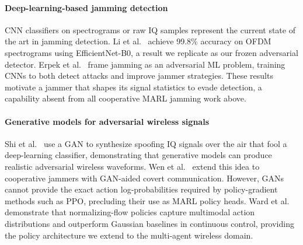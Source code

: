 \paragraph{Deep-learning-based jamming detection}
CNN classifiers on spectrograms or raw IQ samples represent the current
state of the art in jamming detection.
Li et al.~\cite{li2022jamming_ofdm} achieve 99.8\% accuracy on OFDM
spectrograms using EfficientNet-B0, a result we replicate as our frozen
adversarial detector.
Erpek et al.~\cite{erpek2019deep} frame jamming as an adversarial ML problem,
training CNNs to both detect attacks and improve jammer strategies.
These results motivate a jammer that shapes its signal statistics to evade
detection, a capability absent from all cooperative MARL jamming work above.

\paragraph{Generative models for adversarial wireless signals}
Shi et al.~\cite{sagduyu2021gan} use a GAN to synthesize spoofing IQ signals
over the air that fool a deep-learning classifier, demonstrating that generative
models can produce realistic adversarial wireless waveforms.
Wen et al.~\cite{wen2025generative} extend this idea to cooperative jammers with
GAN-aided covert communication.
However, GANs cannot provide the exact action log-probabilities required by
policy-gradient methods such as PPO, precluding their use as MARL policy heads.
Ward et al.~\cite{ward2019nf_rl} demonstrate that normalizing-flow policies
capture multimodal action distributions and outperform Gaussian baselines in
continuous control, providing the policy architecture we extend to the
multi-agent wireless domain.

